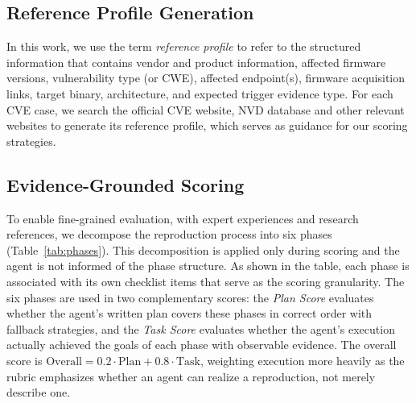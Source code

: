 \subsection{Reference Profile Generation}
\label{sec:dossier}

In this work, we use the term \textit{reference profile} to refer to the
structured information that contains vendor and product information, affected firmware versions, vulnerability type (or CWE), affected endpoint(s), firmware acquisition links, target binary, architecture, and expected trigger evidence type. For each CVE case, we search the official CVE website, NVD database and other relevant websites to generate its reference profile, which serves as guidance for our scoring strategies.

\subsection{Evidence-Grounded Scoring}
\label{sec:assessment}
\label{sec:scoring}
To enable fine-grained evaluation, with expert experiences and research references, we decompose the reproduction process into six phases (Table~\ref{tab:phases}).
This decomposition is applied only during scoring and the agent is not informed of the phase structure.
As shown in the table, each phase is associated with its own checklist items that serve as the scoring granularity.
The six phases are used in two complementary scores: the \emph{Plan Score} evaluates whether the agent's written plan covers these phases in correct order with fallback strategies, and the \emph{Task Score} evaluates whether the agent's execution actually achieved the goals of each phase with observable evidence. The overall score is $\text{Overall}=0.2\cdot\text{Plan}+0.8\cdot\text{Task}$, weighting execution more heavily as the rubric emphasizes whether an agent can realize a reproduction, not merely describe one.

